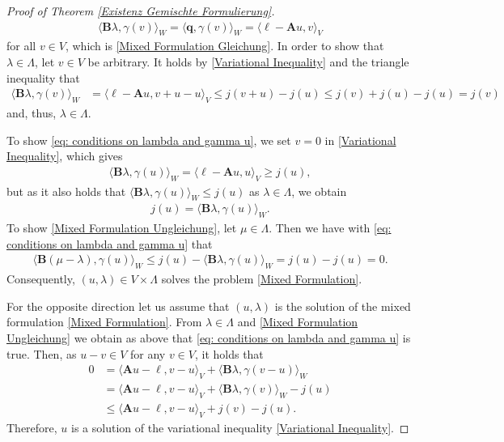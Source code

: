 \documentclass[12pt,twoside,reqno]{amsart}
\theoremstyle{definition}
\numberwithin{equation}{section}
\newcommand{\A} {\bm{A}}
\newcommand{\lin} {\bm{\ell}}
\newcommand{\B} {\bm{B}}
\begin{document}
\begin{proof}[Proof of Theorem \ref{Existenz Gemischte Formulierung}]
        \begin{align*}
            \langle \B \lambda, \gamma(v)\rangle_W = \langle \bm{q}, \gamma(v)\rangle_W = \langle\bm{\ell}-\bm{A}u,v\rangle_V
        \end{align*}
        for all $v\in V$, which is \eqref{Mixed Formulation Gleichung}.
        In order to show that $\lambda\in \Lambda$, let $v\in V$ be arbitrary. It holds by \eqref{Variational Inequality} and the triangle inequality that 
        \begin{align*}
            \langle \B \lambda,\gamma(v)\rangle_W &= \langle \lin-\A u,v+u-u\rangle_V
            \leq j(v+u)-j(u)
            \leq j(v)+j(u)-j(u)
            = j(v)
        \end{align*}
        and, thus, $\lambda\in\Lambda$.

        To show \eqref{eq: conditions on lambda and gamma u}, we set $v=0$ in \eqref{Variational Inequality}, which gives
        \begin{align*}
            \langle \B \lambda,\gamma(u)\rangle_W = \langle \lin -\A u, u\rangle_V \geq j(u),
        \end{align*}
        but as it also holds that $\langle \B \lambda,\gamma(u)\rangle_W\leq j(u)$ as $\lambda\in\Lambda$, we obtain
        \begin{align*}
            j(u) = \langle \B \lambda,\gamma(u)\rangle_W.
        \end{align*}
        To show \eqref{Mixed Formulation Ungleichung}, let $\mu\in\Lambda$. Then we have with \eqref{eq: conditions on lambda and gamma u} that
        \begin{align*}
            \langle \B (\mu-\lambda),\gamma(u)\rangle_W \leq j(u) - \langle \B \lambda,\gamma(u)\rangle_W = j(u)-j(u) = 0.
        \end{align*}
        Consequently, $(u,\lambda)\in V\times \Lambda$ solves the problem \eqref{Mixed Formulation}.

        For the opposite direction let us assume that $(u,{\lambda})$ is the solution of the mixed formulation \eqref{Mixed Formulation}. From $\lambda \in \Lambda$ and \eqref{Mixed Formulation Ungleichung} we obtain as above that \eqref{eq: conditions on lambda and gamma u} is true.     
        Then, as $u-v\in V$ for any $v\in V$, it holds that
        \begin{align*}
            0&= \langle \bm{A}u-\bm{\ell},v-u\rangle_V+\langle\B \lambda,\gamma(v-u)\rangle_W\\
            &= \langle\bm{A}u-\bm{\ell},v-u\rangle_V + \langle\B \lambda,\gamma(v)\rangle_W - j(u)\\
            &\leq  \langle\bm{A}u-\bm{\ell},v-u\rangle_V + j(v) - j(u).
        \end{align*}
        Therefore, $u$ is a solution of the variational inequality \eqref{Variational Inequality}.


\end{proof}
\end{document}
